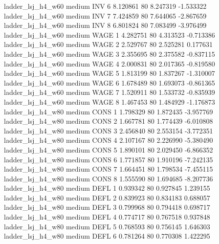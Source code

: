   ladder_lsj_h4_w60     medium      INV                 6  8.120861 80       8.247319          -1.533322
  ladder_lsj_h4_w60     medium      INV                 7  7.424859 80       7.644065          -2.867659
  ladder_lsj_h4_w60     medium      INV                 8  6.801824 80       7.083499          -3.976499
  ladder_lsj_h4_w60     medium     WAGE                 1  4.282751 80       4.313523          -0.713386
  ladder_lsj_h4_w60     medium     WAGE                 2  2.529767 80       2.525281           0.177631
  ladder_lsj_h4_w60     medium     WAGE                 3  2.355695 80       2.375582          -0.837115
  ladder_lsj_h4_w60     medium     WAGE                 4  2.000831 80       2.017365          -0.819580
  ladder_lsj_h4_w60     medium     WAGE                 5  1.813199 80       1.837267          -1.310007
  ladder_lsj_h4_w60     medium     WAGE                 6  1.678489 80       1.693073          -0.861365
  ladder_lsj_h4_w60     medium     WAGE                 7  1.520911 80       1.533732          -0.835939
  ladder_lsj_h4_w60     medium     WAGE                 8  1.467453 80       1.484929          -1.176873
  ladder_lsj_h4_w80     medium     CONS                 1  1.798329 80       1.872435          -3.957769
  ladder_lsj_h4_w80     medium     CONS                 2  1.667781 80       1.774439          -6.010808
  ladder_lsj_h4_w80     medium     CONS                 3  2.456840 80       2.553154          -3.772351
  ladder_lsj_h4_w80     medium     CONS                 4  2.107167 80       2.226990          -5.380490
  ladder_lsj_h4_w80     medium     CONS                 5  1.890101 80       2.029450          -6.866352
  ladder_lsj_h4_w80     medium     CONS                 6  1.771857 80       1.910196          -7.242135
  ladder_lsj_h4_w80     medium     CONS                 7  1.664451 80       1.798534          -7.455115
  ladder_lsj_h4_w80     medium     CONS                 8  1.555590 80       1.694685          -8.207736
  ladder_lsj_h4_w80     medium     DEFL                 1  0.939342 80       0.927845           1.239155
  ladder_lsj_h4_w80     medium     DEFL                 2  0.839923 80       0.834183           0.688057
  ladder_lsj_h4_w80     medium     DEFL                 3  0.799968 80       0.794418           0.698717
  ladder_lsj_h4_w80     medium     DEFL                 4  0.774717 80       0.767518           0.937848
  ladder_lsj_h4_w80     medium     DEFL                 5  0.768593 80       0.756145           1.646303
  ladder_lsj_h4_w80     medium     DEFL                 6  0.781264 80       0.770308           1.422295
